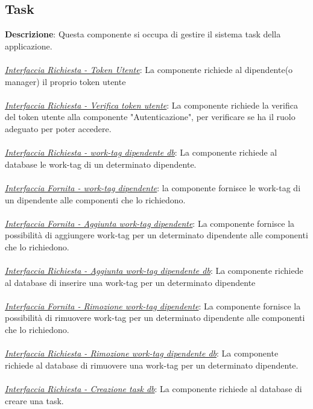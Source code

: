 \documentclass{report}
\begin{document}
\subsection*{Task}

\textbf{Descrizione}: Questa componente si occupa di gestire il sistema task della applicazione.\\\\
\uline{\textit{Interfaccia Richiesta - Token Utente}}:
La componente richiede al dipendente(o manager) il proprio token utente \\ \\
\uline{\textit{Interfaccia Richiesta - Verifica token utente}}: 
La componente richiede la verifica del token utente alla componente "Autenticazione", per verificare se ha il ruolo adeguato per poter accedere. \\ \\ 
\uline{\textit{Interfaccia Richiesta - work-tag dipendente db}}: 
La componente richiede al database le work-tag di un determinato dipendente. \\ \\
\uline{\textit{Interfaccia Fornita - work-tag dipendente}}: 
la componente fornisce le work-tag di un dipendente alle componenti che lo richiedono.\\ \\
\uline{\textit{Interfaccia Fornita - Aggiunta work-tag dipendente}}: 
La componente fornisce la possibilità di aggiungere work-tag per un determinato dipendente alle componenti che lo richiedono.\\ \\
\uline{\textit{Interfaccia Richiesta - Aggiunta work-tag dipendente db}}: 
La componente richiede al database di inserire una work-tag per un determinato dipendente\\ \\ 
\uline{\textit{Interfaccia Fornita - Rimozione work-tag dipendente}}: 
La componente fornisce la possibilità di rimuovere work-tag per un determinato dipendente alle componenti che lo richiedono.\\ \\ 
\uline{\textit{Interfaccia Richiesta - Rimozione work-tag dipendente db}}:  
La componente richiede al database di rimuovere una work-tag per un determinato dipendente. \\ \\ 
\uline{\textit{Interfaccia Richiesta - Creazione task db}}:
La componente richiede al database di creare una task. \\\\
\end{document}

